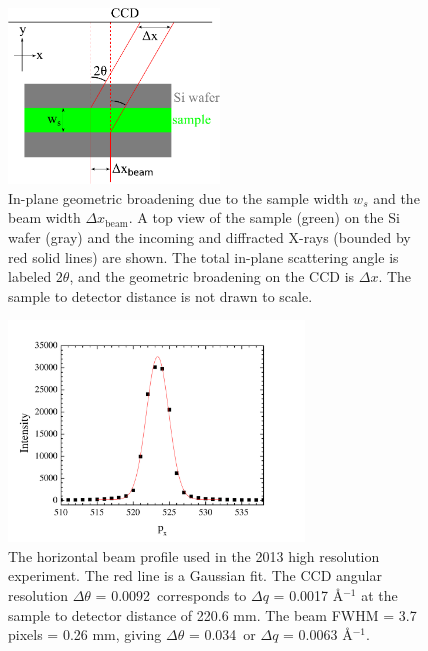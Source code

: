 \begin{figure}[htbp]
  \centering
  \includegraphics[width=0.5\textwidth]{figures/ripple/MMs/waxs/geometric_broadening}
  \caption[In-plane geometric broadening due to the sample width $w_s$ and 
  the beam width $\Delta x_\textrm{beam}$]
  {In-plane geometric broadening due to the sample width $w_s$ and 
  the beam width $\Delta x_\textrm{beam}$.
  A top view of the sample (green) on the Si wafer (gray) and the
  incoming and diffracted X-rays (bounded by red solid lines)
  are shown. The total in-plane scattering
  angle is labeled $2\theta$, and 
  the geometric broadening on the CCD is $\Delta x$.
  The sample to detector distance is not drawn to scale.}
  \label{fig:geometric_broadening}
\end{figure}

\begin{figure}[htbp]
  \centering
  \includegraphics[width=0.7\textwidth]{figures/ripple/MMs/waxs/beamx_hr}
  \caption[The horizontal beam profile used in the 2013 high resolution 
  experiment]
  {The horizontal beam profile used in the 2013 high resolution 
  experiment. The red line is a Gaussian fit.
  The CCD angular resolution $\Delta\theta$ = 0.0092\textdegree\,
  corresponds to $\Delta q$ = 0.0017 \AA$^{-1}$ at the sample to detector
  distance of 220.6 mm. The beam FWHM = 3.7 pixels = 0.26 mm, giving
  $\Delta\theta$ = 0.034\textdegree\ or $\Delta q$ = 0.0063 \AA$^{-1}$. }
  \label{fig:nGIWAXS_beamx}
\end{figure} 

